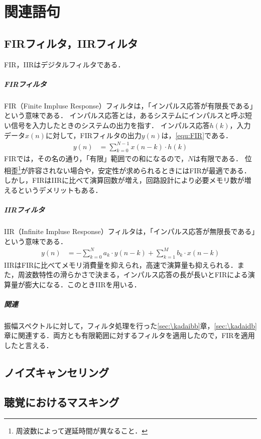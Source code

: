 \chapter{関連語句}
\section{FIRフィルタ，IIRフィルタ}
FIR，IIRはデジタルフィルタである．
\paragraph{FIRフィルタ}
FIR（Finite Impluse Response）フィルタは，「インパルス応答が有限長である」という意味である\cite[p.92]{音声音響インタフェース実践}．
インパルス応答とは，あるシステムにインパルスと呼ぶ短い信号を入力したときのシステムの出力を指す．
インパルス応答\(h(k)\)，入力データ\(x(n)\)に対して，FIRフィルタの出力\(y(n)\)は，\eqref{equ:FIR}である．
\begin{align}
    y(n) & =\sum_{k=0}^{N-1}x(n-k)\cdot h(k)\label{equ:FIR}
\end{align}
FIRでは，その名の通り，「有限」範囲での和になるので，\(N\)は有限である．
位相歪\footnote{周波数によって遅延時間が異なること．}が許容されない場合や，安定性が求められるときにはFIRが最適である．
しかし，FIRはIIRに比べて演算回数が増え，回路設計により必要メモリ数が増えるというデメリットもある．
\paragraph{IIRフィルタ}
IIR（Infinite Impluse Response）フィルタは，「インパルス応答が無限長である」という意味である\cite[p.92]{音声音響インタフェース実践}．
\begin{align}
    y(n) & =-\sum_{k=0}^{N}a_k\cdot y(n-k)+\sum_{k=1}^{M}b_k\cdot x(n-k)\label{equ:IIR}
\end{align}
IIRはFIRに比べてメモリ消費量を抑えられ，高速で演算量も抑えられる．また，周波数特性の滑らかさで決まる，インパルス応答の長が長いとFIRによる演算量が膨大になる．このときIIRを用いる．
\paragraph{関連}
振幅スペクトルに対して，フィルタ処理を行った\ref{sec:\kadaibb}章，\ref{sec:\kadaidb}章に関連する．両方とも有限範囲に対するフィルタを適用したので，FIRを適用したと言える．
\section{ノイズキャンセリング}
\section{聴覚におけるマスキング}